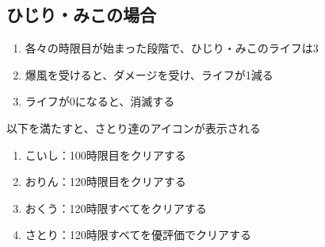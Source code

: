 \subsection{ひじり・みこの場合}
\begin{enumerate}[label={\sarrow}]
\item 各々の時限目が始まった段階で、ひじり・みこのライフは3
\item 爆風を受けると、ダメージを受け、ライフが1減る
\item ライフが0になると、消滅する
\end{enumerate}



\clearpage
以下を満たすと、さとり達のアイコンが表示される
\begin{enumerate}[label={\sarrow}]
\item こいし：100時限目をクリアする
\item おりん：120時限目をクリアする
\item おくう：120時限すべてをクリアする
\item さとり：120時限すべてを優評価でクリアする
\end{enumerate}







